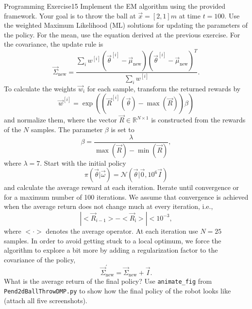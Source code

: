 \begin{questions}
\begin{question}{Programming Exercise}{15}
Implement the EM algorithm using the provided framework. Your goal is to throw the ball at $\vec x = [2,1]m$ at time $t=100$. Use the weighted Maximum Likelihood (ML) solutions for updating the parameters of the policy. For the mean, use the equation derived at the previous exercise. For the covariance, the update rule is 
\begin{equation}
	\vec \Sigma_\mathrm{new} = \frac{\sum_i w^{[i]} (\vec{\theta}^{[i]}-\vec{\mu}_{\mathrm{new}})     (\vec{\theta}^{[i]}-\vec{\mu}_{\mathrm{new}})^T}{\sum_i w^{[i]}}.
\end{equation}
To calculate the weights $\vec{w}_i$ for each sample, transform the returned rewards by 
\begin{equation}
	\vec w^{[i]} = \exp ( ( \vec{R}^{[i]}(\vec{\theta}) - \max(\vec{R}) ) \beta )
\end{equation}
and normalize them, where the vector $\vec R\in \mathbb{R}^{N \times 1}$ is constructed from the rewards of the $N$ samples. The
parameter $\beta$ is set to
\begin{equation}
	\beta = \frac{\lambda}{ \max(\vec{R}) - \min(\vec{R}) },
\end{equation}
where $\lambda = 7$. Start with the initial policy 
\begin{equation}
	\pi(\vec{\theta}|\vec{\omega}) = \mathcal{N}(\vec{\theta}|\vec{0}, 10^6  \vec{I})
\end{equation}
and calculate the average reward at each iteration. Iterate until convergence or for a maximum number of 100 iterations.
We assume that convergence is achieved when the average return does not change much at every iteration, i.e., 
$$ | <\vec{R}_{i-1}> - <\vec{R}_\textrm{i}> | < 10^{-3}, $$
where $<\cdot>$ denotes the average operator.
At each iteration use 
$ N = 25 $ samples. In order to avoid getting stuck to a local optimum, we force the algorithm to explore a bit more by adding a regularization factor to the covariance of the policy,
\begin{equation}
    \vec{\Sigma}_\mathrm{new}^\mathrm{'} = \vec{\Sigma}_\mathrm{new} + \vec{I}.
\end{equation}
What is the average return of the final policy? 
Use \texttt{animate\_fig} from \texttt{Pend2dBallThrowDMP.py} to show how the final policy of the robot looks like (attach all five screenshots).

\begin{answer}


\end{answer}
\end{question}
\end{questions}
